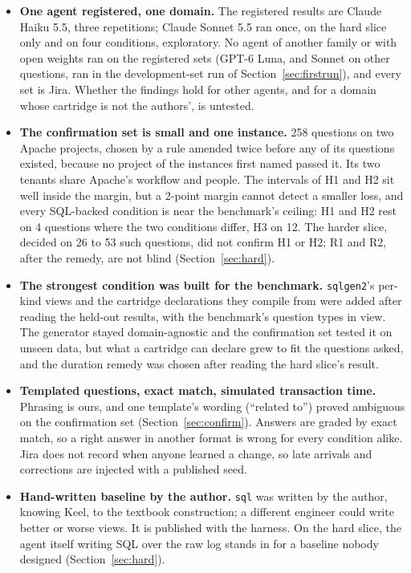 \documentclass[sigconf, nonacm]{acmart}
\newcommand{\code}[1]{\texttt{#1}}
\begin{document}
\begin{itemize}[leftmargin=*]
\item \textbf{One agent registered, one domain.} The registered results are Claude Haiku 5.5, three repetitions; Claude Sonnet 5.5 ran once, on the hard slice only and on four conditions, exploratory. No agent of another family or with open weights ran on the registered sets (GPT-6 Luna, and Sonnet on other questions, ran in the development-set run of Section~\ref{sec:firstrun}), and every set is Jira. Whether the findings hold for other agents, and for a domain whose cartridge is not the authors', is untested.
\item \textbf{The confirmation set is small and one instance.} 258 questions on two Apache projects, chosen by a rule amended twice before any of its questions existed, because no project of the instances first named passed it. Its two tenants share Apache's workflow and people. The intervals of H1 and H2 sit well inside the margin, but a 2-point margin cannot detect a smaller loss, and every SQL-backed condition is near the benchmark's ceiling: H1 and H2 rest on 4 questions where the two conditions differ, H3 on 12. The harder slice, decided on 26 to 53 such questions, did not confirm H1 or H2; R1 and R2, after the remedy, are not blind (Section~\ref{sec:hard}).
\item \textbf{The strongest condition was built for the benchmark.} \code{sqlgen2}'s per-kind views and the cartridge declarations they compile from were added after reading the held-out results, with the benchmark's question types in view. The generator stayed domain-agnostic and the confirmation set tested it on unseen data, but what a cartridge can declare grew to fit the questions asked, and the duration remedy was chosen after reading the hard slice's result.
\item \textbf{Templated questions, exact match, simulated transaction time.} Phrasing is ours, and one template's wording (``related to'') proved ambiguous on the confirmation set (Section~\ref{sec:confirm}). Answers are graded by exact match, so a right answer in another format is wrong for every condition alike. Jira does not record when anyone learned a change, so late arrivals and corrections are injected with a published seed.
\item \textbf{Hand-written baseline by the author.} \code{sql} was written by the author, knowing Keel, to the textbook construction; a different engineer could write better or worse views. It is published with the harness. On the hard slice, the agent itself writing SQL over the raw log stands in for a baseline nobody designed (Section~\ref{sec:hard}).

\end{itemize}
\end{document}
